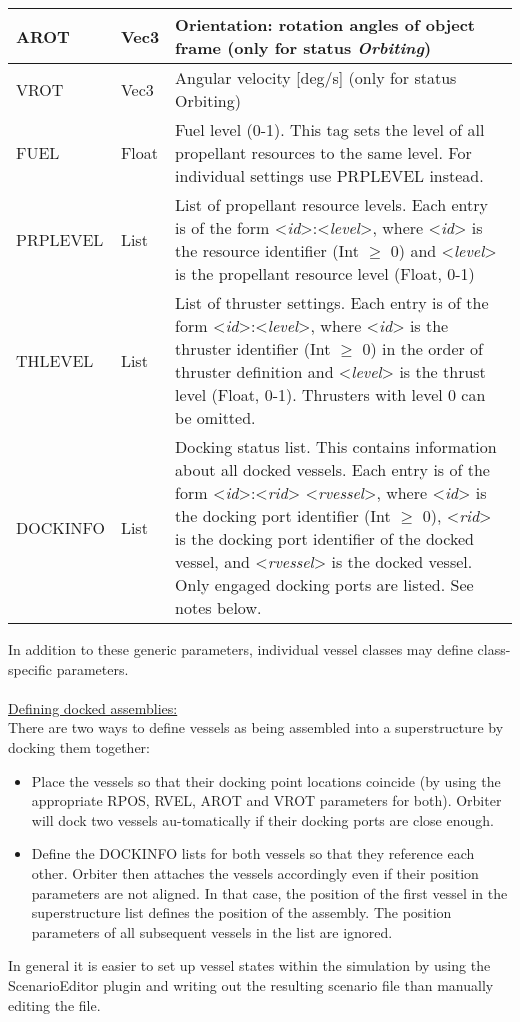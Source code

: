 \documentclass[Orbiter Developer Manual.tex]{subfiles}
\begin{document}
\begin{longtable}{ |p{}|p{}|p{}| }
	\hline\rule{0pt}{2ex}
	AROT & Vec3 & Orientation: rotation angles of object frame (only for status \textit{Orbiting})\\
	\hline\rule{0pt}{2ex}
	VROT & Vec3 & Angular velocity [deg/s] (only for status Orbiting)\\
	\hline\rule{0pt}{2ex}
	FUEL & Float & Fuel level (0-1). This tag sets the level of all propellant resources to the same level. For individual settings use PRPLEVEL instead.\\
	\hline\rule{0pt}{2ex}
	PRPLEVEL & List & List of propellant resource levels. Each entry is of the form <\textit{id}>:<\textit{level}>, where <\textit{id}> is the resource identifier (Int $\geq$ 0) and <\textit{level}> is the propellant resource level (Float, 0-1)\\
	\hline\rule{0pt}{2ex}
	THLEVEL & List & List of thruster settings. Each entry is of the form <\textit{id}>:<\textit{level}>, where <\textit{id}> is the thruster identifier (Int $\geq$ 0) in the order of thruster definition and <\textit{level}> is the thrust level (Float, 0-1). Thrusters with level 0 can be omitted.\\
	\hline\rule{0pt}{2ex}
	DOCKINFO & List & Docking status list. This contains information about all docked vessels. Each entry is of the form <\textit{id}>:<\textit{rid}> <\textit{rvessel}>, where <\textit{id}> is the docking port identifier (Int $\geq$ 0), <\textit{rid}> is the docking port identifier of the docked vessel, and <\textit{rvessel}> is the docked vessel. Only engaged docking ports are listed. See notes below.\\
	\hline
	\end{longtable}

\noindent
In addition to these generic parameters, individual vessel classes may define class-specific parameters.\\
\\
\underline{Defining docked assemblies:}\\
There are two ways to define vessels as being assembled into a superstructure by docking them together:

\begin{itemize}
\item Place the vessels so that their docking point locations coincide (by using the appropriate RPOS, RVEL, AROT and VROT parameters for both). Orbiter will dock two vessels au-tomatically if their docking ports are close enough.
\item Define the DOCKINFO lists for both vessels so that they reference each other. Orbiter then attaches the vessels accordingly even if their position parameters are not aligned. In that case, the position of the first vessel in the superstructure list defines the position of the assembly. The position parameters of all subsequent vessels in the list are ignored.
\end{itemize}

\noindent
In general it is easier to set up vessel states within the simulation by using the ScenarioEditor plugin and writing out the resulting scenario file than manually editing the file.
\end{document}
